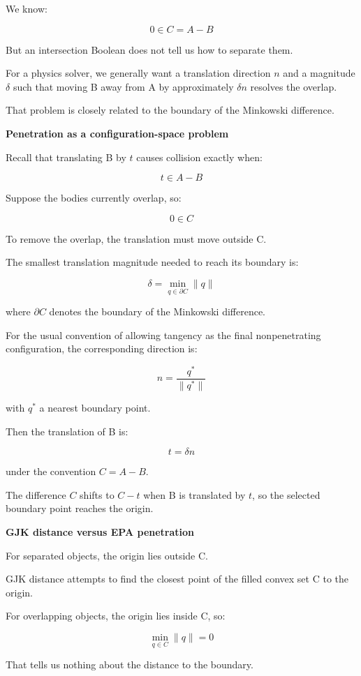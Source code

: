 We know:

\[
0\in C=A-B
\]

But an intersection Boolean does not tell us how to separate them.

For a physics solver, we generally want a translation direction \(n\) and a magnitude \(\delta\) such that moving B away from A by approximately \(\delta n\) resolves the overlap.

That problem is closely related to the boundary of the Minkowski difference.

\textbf{Penetration as a configuration-space problem}

Recall that translating B by \(t\) causes collision exactly when:

\[
t\in A-B
\]

Suppose the bodies currently overlap, so:

\[
0\in C
\]

To remove the overlap, the translation must move outside C.

The smallest translation magnitude needed to reach its boundary is:

\[
\boxed{ \delta=\min_{q\in\partial C}\|q\| }
\]

where \(\partial C\) denotes the boundary of the Minkowski difference.

For the usual convention of allowing tangency as the final nonpenetrating configuration, the corresponding direction is:

\[
\boxed{ n=\frac{q^*}{\|q^*\|} }
\]

with \(q^*\) a nearest boundary point.

Then the translation of B is:

\[
\boxed{ t=\delta n }
\]

under the convention \(C=A-B\).

The difference \(C\) shifts to \(C-t\) when B is translated by \(t\), so the selected boundary point reaches the origin.

\textbf{GJK distance versus EPA penetration}

For separated objects, the origin lies outside C.

GJK distance attempts to find the closest point of the filled convex set C to the origin.

For overlapping objects, the origin lies inside C, so:

\[
\min_{q\in C}\|q\|=0
\]

That tells us nothing about the distance to the boundary.

